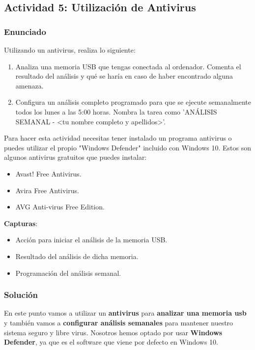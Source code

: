 \subsection{Actividad 5: Utilización de Antivirus}

\subsubsection{Enunciado}
Utilizando un antivirus, realiza lo siguiente:

\begin{enumerate}
    \item Analiza una memoria USB que tengas conectada al ordenador. Comenta el resultado del análisis y qué se haría en caso de haber encontrado alguna amenaza.
    \item Configura un análisis completo programado para que se ejecute semanalmente todos los lunes a las 5:00 horas. Nombra la tarea como 'ANÁLISIS SEMANAL - <tu nombre completo y apellidos>'.
\end{enumerate}

Para hacer esta actividad necesitas tener instalado un programa antivirus o puedes utilizar el propio "Windows Defender" incluido con Windows 10. Estos son algunos antivirus gratuitos que puedes instalar:

\begin{itemize}
    \item Avast! Free Antivirus.
    \item Avira Free Antivirus.
    \item AVG Anti-virus Free Edition.
\end{itemize}

\textbf{Capturas}:

\begin{itemize}
    \item Acción para iniciar el análisis de la memoria USB.
    \item Resultado del análisis de dicha memoria.
    \item Programación del análisis semanal.
\end{itemize}

\subsubsection{Solución}
En este punto vamos a utilizar un \textbf{antivirus} para \textbf{analizar una memoria usb} y también vamos a \textbf{configurar análisis semanales} para mantener nuestro sistema seguro y libre virus. Nosotros hemos optado por usar \textbf{Windows Defender}, ya que es el software que viene por defecto en Windows 10.

